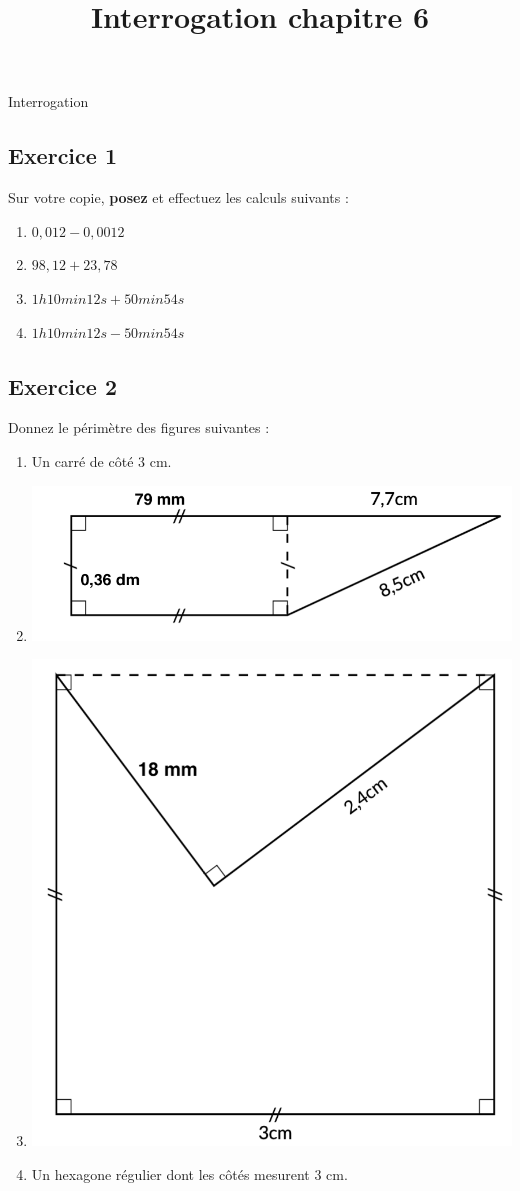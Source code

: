 \documentclass[14 pt]{extarticle}
\title{Interrogation chapitre 6}
\date{}
\theoremstyle{plain}
\begin{document}
\begin{center}{\Large Interrogation}\\ 
 \end{center}
 \subsection*{Exercice 1}
 Sur votre copie, \textbf{posez} et effectuez les calculs suivants : 
 \begin{enumerate}
 \item $0, 012 -0, 0012$ %
 \item $98,12 + 23, 78$
 \item $1h 10 min 12 s + 50 min 54 s$
 \item $1h 10 min 12 s - 50 min 54 s$
 \end{enumerate}
 
 
 \subsection*{Exercice 2}
 
 Donnez le périmètre des figures suivantes : 
 \begin{enumerate}
 \item Un carré de côté $3$ cm.
 \item \includegraphics[scale=1]{Exo4a}
 \item \includegraphics[scale=.5]{Exo4b}
 \item Un hexagone régulier dont les côtés mesurent $3$ cm. 
 \end{enumerate}
 
\end{document}
